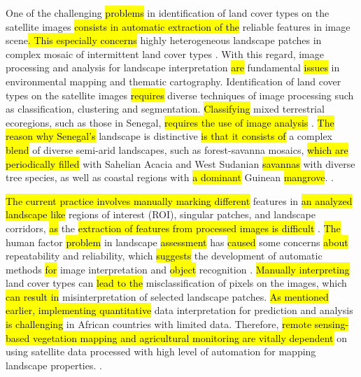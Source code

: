 \documentclass[earth,article,submit,pdftex,moreauthors]{Definitions/mdpi}
\begin{document}
One of the challenging \hl{problems} in identification of land cover types on the satellite images \hl{consists in automatic extraction of the} reliable features in image scene\hl{. This especially concerns }highly heterogeneous landscape patches in complex mosaic of intermittent land cover types \cite{CAMPOS2018211,SYIFA2020919}. With this regard, image processing and analysis for landscape interpretation \hl{are} fundamental \hl{issues} in environmental mapping and thematic cartography. Identification of land cover types on the satellite images \hl{requires} diverse techniques of image processing such as classification, clustering and segmentation. \hl{Classifying} mixed terrestrial ecoregions, such as those in Senegal, \hl{requires the use of image analysis} \cite{BUDDE2004481}. \hl{The reason why Senegal's} landscape is distinctive \hl{is that it consists of} a complex \hl{blend} of diverse semi-arid landscapes, such as forest-savanna mosaics, \hl{which are periodically filled} with Sahelian Acacia and West Sudanian \hl{savannas} with diverse tree species, as well as coastal regions with \hl{a dominant} Guinean \hl{mangrove}.
\cite{TAPPAN2004427,DEANS2003253}.

\hl{The current practice involves manually marking different} features in \hl{an analyzed landscape like} regions of interest (ROI), singular patches, and landscape corridors, \hl{as} the \hl{extraction of features from processed images is difficult}
 \cite{CABRAL2017115}. \hl{The} human factor \hl{problem} in landscape \hl{assessment }has \hl{caused} some concerns \hl{about} repeatability and reliability, which \hl{suggests} the development of automatic methods \hl{for} image interpretation and \hl{object} recognition \cite{CONCHEDDA2008578,rs9020181,rs12091436}. \hl{Manually interpreting} land cover types can \hl{lead to the} misclassification of pixels on the images, which \hl{can result in} misinterpretation of selected landscape patches. \hl{As mentioned earlier, implementing quantitative} data interpretation for prediction and analysis \hl{is challenging} in African countries with limited data\cite{STOORVOGEL2009161}. Therefore, \hl{remote sensing-based vegetation mapping and agricultural monitoring are vitally dependent} on using satellite data processed with high level of automation for mapping landscape properties.
 \cite{PEREZHOYOS2020102064,BRANDT2016215}.  
\end{document}
